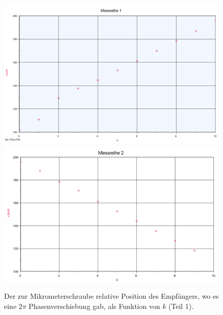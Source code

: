 \documentclass[11pt,a4paper]{article}
\begin{document}
\begin{figure}[p]
	\centering
	\includegraphics[width=\linewidth]{Anhang1}
	\includegraphics[width=\linewidth]{Anhang2}
	\caption{Der zur Mikrometerschraube relative Position des Empfängers, wo es eine $2\pi$ Phasenverschiebung gab, als Funktion von $k$ (Teil 1).}
\end{figure}
\end{document}
